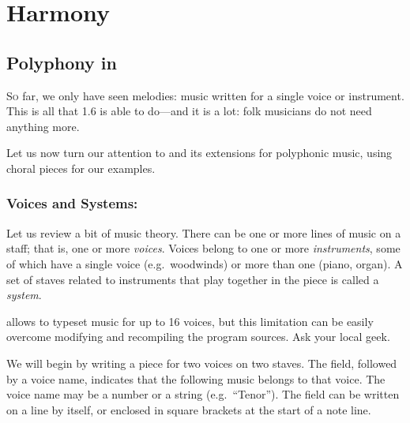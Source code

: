 \documentclass[a4paper,fullpage,12pt]{book}
\begin{document}


\noteseparator



\chapter{Harmony}

\section{Polyphony in \ABC}
\label{sec:polyphony}

\lettrine{S}{o} far, we only have seen melodies: music written for a
single voice or instrument. This is all that \ABC{} 1.6 is able to
do---and it is a lot: folk musicians do not need anything more.

Let us now turn our attention to \ABCPLUS{} and its extensions for
polyphonic music, using choral pieces for our examples.


\subsection{Voices and Systems: }

Let us review a bit of music theory. There can be one or more lines of
music on a staff; that is, one or more \emph{voices}. Voices belong to
one or more \emph{instruments}, some of which have a single voice
(e.g.\ woodwinds) or more than one (piano, organ). A set of staves
related to instruments that play together in the piece is called a
\emph{system}.

\begin{note}

  \abcm{} allows to typeset music for up to 16 voices, but this
  limitation can be easily overcome modifying and recompiling the
  program sources. Ask your local geek.

\end{note}

We will begin by writing a piece for two voices on two staves. The
 field, followed by a voice name, indicates that the
following music belongs to that voice. The voice name may be a number
or a string (e.g.\ ``Tenor''). The  field can be written on
a line by itself, or enclosed in square brackets at the start of a
note line.
\end{document}

